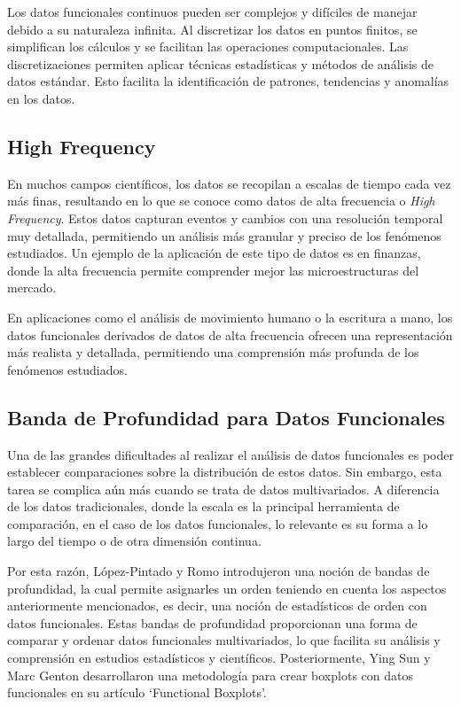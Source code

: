 Los datos funcionales continuos pueden ser complejos y difíciles de manejar debido a su naturaleza infinita. Al discretizar los datos en puntos finitos, se simplifican los cálculos y se facilitan las operaciones computacionales. Las discretizaciones permiten aplicar técnicas estadísticas y métodos de análisis de datos estándar. Esto facilita la identificación de patrones, tendencias y anomalías en los datos.

\subsection{High Frequency}

En muchos campos científicos, los datos se recopilan a escalas de tiempo cada vez más finas, resultando en lo que se conoce como datos de alta frecuencia o \textit{High Frequency}. Estos datos capturan eventos y cambios con una resolución temporal muy detallada, permitiendo un análisis más granular y preciso de los fenómenos estudiados. Un ejemplo de la aplicación de este tipo de datos es en finanzas, donde la alta frecuencia permite comprender mejor las microestructuras del mercado. \cite{Tsay2000}

 En aplicaciones como el análisis de movimiento humano o la escritura a mano, los datos funcionales derivados de datos de alta frecuencia ofrecen una representación más realista y detallada, permitiendo una comprensión más profunda de los fenómenos estudiados.

\subsection{Banda de Profundidad para Datos Funcionales}

Una de las grandes dificultades al realizar el análisis de datos funcionales es poder establecer comparaciones sobre la distribución de estos datos. Sin embargo, esta tarea se complica aún más cuando se trata de datos multivariados. A diferencia de los datos tradicionales, donde la escala es la principal herramienta de comparación, en el caso de los datos funcionales, lo relevante es su forma a lo largo del tiempo o de otra dimensión continua.

Por esta razón, López-Pintado y Romo introdujeron una noción de bandas de profundidad, la cual permite asignarles un orden teniendo en cuenta los aspectos anteriormente mencionados, es decir, una noción de estadísticos de orden con datos funcionales. Estas bandas de profundidad proporcionan una forma de comparar y ordenar datos funcionales multivariados, lo que facilita su análisis y comprensión en estudios estadísticos y científicos. Posteriormente, Ying Sun y Marc Genton desarrollaron una metodología para crear boxplots con datos funcionales en su artículo `Functional Boxplots'. \cite{boxplotFun}

